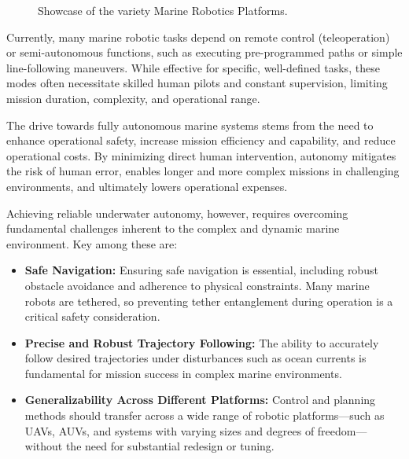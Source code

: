 \begin{figure}[!h]
    \caption{Showcase of the variety Marine Robotics Platforms.}
    \label{fig:underwater_robotics_applications}
\end{figure}


Currently, many marine robotic tasks depend on remote control (teleoperation) or semi-autonomous functions, such as executing pre-programmed paths or simple line-following maneuvers. While effective for specific, well-defined tasks, these modes often necessitate skilled human pilots and constant supervision, limiting mission duration, complexity, and operational range.

The drive towards fully autonomous marine systems stems from the need to enhance operational safety, increase mission efficiency and capability, and reduce operational costs. By minimizing direct human intervention, autonomy mitigates the risk of human error, enables longer and more complex missions in challenging environments, and ultimately lowers operational expenses.


Achieving reliable underwater autonomy, however, requires overcoming fundamental challenges inherent to the complex and dynamic marine environment. Key among these are:

\begin{itemize}
    \item \textbf{Safe Navigation:} Ensuring safe navigation is essential, including robust obstacle avoidance and adherence to physical constraints. Many marine robots are tethered, so preventing tether entanglement during operation is a critical safety consideration.

    \item \textbf{Precise and Robust Trajectory Following:} The ability to accurately follow desired trajectories under disturbances such as ocean currents is fundamental for mission success in complex marine environments.

    \item \textbf{Generalizability Across Different Platforms:} Control and planning methods should transfer across a wide range of robotic platforms—such as UAVs, AUVs, and systems with varying sizes and degrees of freedom—without the need for substantial redesign or tuning.
\end{itemize}


















